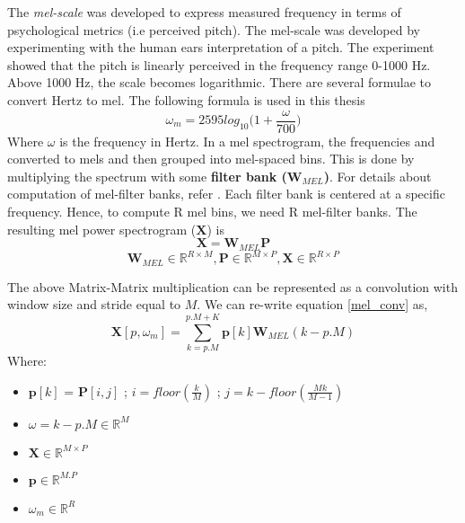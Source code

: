 The \textit{mel-scale} was developed to express measured frequency in terms of psychological metrics (i.e perceived pitch). The mel-scale was developed
by experimenting with the human ears interpretation of a pitch. The experiment showed that the pitch is linearly perceived in the frequency range 0-1000 Hz. Above
1000 Hz, the scale becomes logarithmic. There are several formulae to convert Hertz to mel. The following formula is used in this thesis\cite{speech}
\begin{equation}
\omega_{m} = 2595log_{10}\bigg(1+\frac{ \omega }{700}\bigg)
\end{equation}
Where $\omega$ is the frequency in Hertz. In a mel spectrogram, the frequencies and converted to mels and then grouped into mel-spaced bins. This is done by multiplying the spectrum with some \textbf{filter bank ($\textbf{W}_{MEL}$)}. For details about computation of mel-filter banks, refer \cite{mel}. Each filter bank is centered at a specific frequency. Hence, to compute R mel bins, we need R mel-filter banks. The resulting mel power spectrogram ($\textbf{X}$) is
\begin{equation}
\label{mel_conv}
\textbf{X} = \textbf{W}_{MEL}\textbf{P}
\end{equation}
\[
 \textbf{W}_{MEL} \in  \mathbb{R}^{R \times M}, \textbf{P} \in \mathbb{R}^{M \times P}, \textbf{X} \in \mathbb{R}^{R \times P}
\]

\noindent The above Matrix-Matrix multiplication can be represented as a convolution with window size and stride equal to $M$. We can re-write equation \ref{mel_conv} as, 
\begin{equation}
\label{mel_conv_flat}
\textbf{X}[p,\omega_{m}] = \displaystyle\sum_{k=p.M}^{p.M + K}\textbf{p}[k]\textbf{W}_{MEL}(k-p.M)
\end{equation}
Where:
\begin{itemize}[label=]
    \setlength\itemsep{0em}
    \item $\textbf{p}[k]$ = $\textbf{P}[i,j]$ ; $i = floor(\frac{k}{M})$ ; $j = k-floor(\frac{Mk}{M-1})$
    \item $\omega = k-p.M \in \mathbb{R}^{M}$
    \item $\textbf{X} \in \mathbb{R}^{M \times P}$
    \item $\textbf{p} \in \mathbb{R}^{M.P}$
    \item $\omega_{m} \in  \mathbb{R}^{R}$
\end{itemize}

